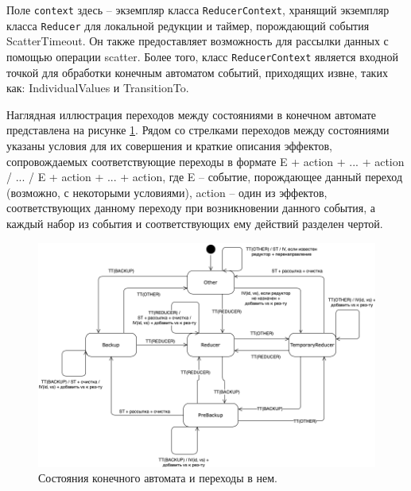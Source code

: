 \documentclass{article}
\theoremstyle{plain}
\theoremstyle{plain}
\theoremstyle{plain}
\theoremstyle{plain}
\theoremstyle{definition}
\theoremstyle{remark}
\theoremstyle{plain}
\begin{document}

Поле \texttt{context} здесь -- экземпляр класса \texttt{ReducerContext}, хранящий экземпляр класса \texttt{Reducer} для локальной редукции и таймер, порождающий события ScatterTimeout. Он также предоставляет возможность для рассылки данных с помощью операции scatter. Более того, класс \texttt{ReducerContext} является входной точкой для обработки конечным автоматом событий, приходящих извне, таких как: IndividualValues и TransitionTo.

Наглядная иллюстрация переходов между состояниями в конечном автомате представлена на рисунке \ref{StateMachineImage}. Рядом со стрелками переходов между состояниями указаны условия для их совершения и краткие описания эффектов, сопровождаемых соответствующие переходы в формате E + action + ... + action / ... / E + action + ... + action, где E -- событие, порождающее данный переход (возможно, с некоторыми условиями), action -- один из эффектов, соответствующих данному переходу при возникновении данного события, а каждый набор из события и соответствующих ему действий разделен чертой.

\begin{figure}[h]
\centering
\includegraphics[scale=0.45]{images/NeighbourStateMachine_rus.png}
\captionsetup{justification=centering}
\caption{Состояния конечного автомата и переходы в нем.}
\label{StateMachineImage}
\end{figure}
\end{document}
